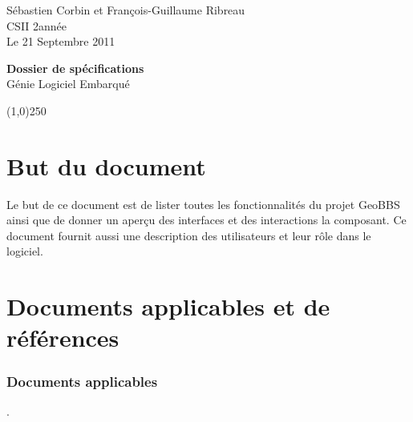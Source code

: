\documentclass[a4paper,12pt]{report}
\begin{document}
  \begin{onehalfspace}

    \begin{titlepage}
      \begin{center}
        Sébastien Corbin et François-Guillaume Ribreau\\
        CSII 2\ieme année\\
        Le 21 Septembre 2011\\
      \end{center}
      \hrulefill
      \vspace{7cm}
      \begin{center}
        \LARGE \textbf{Dossier de spécifications}\\
        \vspace{3cm}
        \normalsize Génie Logiciel Embarqué
      \end{center}

      \vspace{9,5cm}

      \begin{center}
      \line(1,0){250}
      \end{center}

      \begin{center}
      \tiny{\currfilename}
      \end{center}


    \end{titlepage}
    \clearpage

  \thispagestyle{empty}
  \setcounter{page}{0}
  \clearpage

\chapter{But du document}
Le but de ce document est de lister toutes les fonctionnalités du projet GeoBBS ainsi que de donner un aperçu des interfaces et des interactions la composant. Ce document fournit aussi une description des utilisateurs et leur rôle dans le logiciel.

\chapter{Documents applicables et de références}

\subsection{Documents applicables} %
\label{sub:documents_applicables}
.


\end{onehalfspace}
\end{document}
